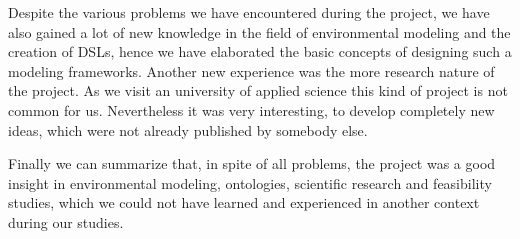 \par
Despite the various problems we have encountered during the project, we have also gained a lot of new knowledge in the field of environmental modeling and the creation of DSLs, hence we have elaborated the basic concepts of designing such a modeling frameworks. Another new experience was the more research nature of the project. As we visit an university of applied science this kind of project is not common for us. Nevertheless it was very interesting, to develop completely new ideas, which were not already published by somebody else.
\par
Finally we can summarize that, in spite of all problems, the project was a good insight in environmental modeling, ontologies, scientific research and feasibility studies, which we could not have learned and experienced in another context during our studies.   
















